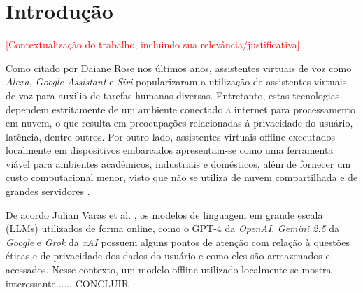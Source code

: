 


\chapter{Introdução}
\label{chap:introducao}

\textcolor{red}{[Contextualização do trabalho, incluindo sua relevância/justificativa]}


Como citado por Daiane Rose \cite{DaSilvaMatos2021AnliseCA} nos últimos anos, assistentes virtuais de voz como \textit{Alexa, Google Assistant} e \textit{Siri} popularizaram a utilização de assistentes virtuais de voz para auxilio de tarefas humanas diversas.  Entretanto, estas tecnologias dependem estritamente de um ambiente conectado a internet para processamento em nuvem, o que resulta em preocupações relacionadas à privacidade do usuário, latência, dentre outros. Por outro lado, assistentes virtuais offline executados localmente em dispositivos embarcados apresentam-se como uma ferramenta viável para ambientes acadêmicos, industriais e domésticos, além de fornecer um custo computacional menor, visto que não se utiliza de nuvem compartilhada e de grandes servidores \cite{jurafsky2023}.  



De acordo Julian Varas et al. \cite{varas2023llm}, os modelos de linguagem em grande escala (LLMs) utilizados de forma online, como o GPT-4 da \textit{OpenAI}, \textit{Gemini 2.5} da \textit{Google} e \textit{Grok } da \textit{xAI} possuem alguns pontos de atenção com relação à questões éticas e de privacidade dos dados do usuário e como eles são armazenados e acessados. Nesse contexto, um modelo offline utilizado localmente se mostra interessante...... CONCLUIR 




